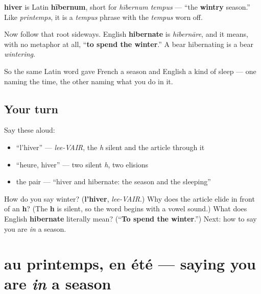\begin{cousinweb}
\textbf{hiver} is Latin \textbf{hībernum}, short for \emph{hībernum tempus} — \textquotedblleft{}the \textbf{wintry} season.\textquotedblright{} Like \emph{printemps}, it is a \emph{tempus} phrase with the \emph{tempus} worn off.

Now follow that root sideways. English \textbf{hibernate} is \emph{hībernāre}, and it means, with no metaphor at all, \textquotedblleft{}\textbf{to spend the winter}.\textquotedblright{} A bear hibernating is a bear \emph{wintering}.

So the same Latin word gave French a season and English a kind of sleep — one naming the time, the other naming what you do in it.
\end{cousinweb}

\subsection*{Your turn}
Say these aloud:

\begin{itemize}
\raggedright
  \item \textquotedblleft{}l'hiver\textquotedblright{} — \emph{lee-VAIR}, the \emph{h} silent and the article through it
  \item \textquotedblleft{}heure, hiver\textquotedblright{} — two silent \emph{h}, two elisions
  \item the pair — \textquotedblleft{}hiver and hibernate: the season and the sleeping\textquotedblright{}
\end{itemize}

\begin{tcolorbox}[breakable,colback=teal!4,colframe=teal!35!black,title={Before you move on}]
How do you say winter? (\textbf{l'hiver}, \emph{lee-VAIR}.) Why does the article elide in front of an \textbf{h}? (The \textbf{h} is silent, so the word begins with a vowel sound.) What does English \textbf{hibernate} literally mean? (\textquotedblleft{}\textbf{To spend the winter}.\textquotedblright{}) Next: how to say you are \emph{in} a season.
\end{tcolorbox}
\section[au printemps, en été]{au printemps, en été — saying you are \emph{in} a season}

\label{lesson:FR-C09-en-saison}



